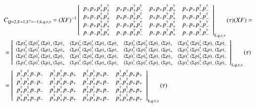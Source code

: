 \renewcommand{\dscor}[4]{\left(\Sigma p\right)_{#1}^\dagger \left(\Sigma p\right)_{#2}^\dagger \left(\Sigma p\right)_{#3}\left(\Sigma p\right)_{#4}}
\renewcommand{\dcor}[4]{p^\dagger_{#1}p^\dagger_{#2}p_{#3}p_{#4}}
\newcommand{\rcor}[4]{p_{#3}p_{#4}p^\dagger_{#1}p^\dagger_{#2}}
\begin{equation}
  \begin{aligned} 
    &C_{Q=2,S=1,S^3=-1;k,q,r,s} =
    (XF)^{-1} \left[
    \begin{array}{cccc}
      \cor{+}{+}{+}{+} & \cor{+}{+}{+}{-} & \cor{+}{+}{-}{+} & \cor{+}{+}{-}{-} \\
      \cor{+}{-}{+}{+} & \cor{+}{-}{+}{-} & \cor{+}{-}{-}{+} & \cor{+}{-}{-}{-} \\
      \cor{-}{+}{+}{+} & \cor{-}{+}{+}{-} & \cor{-}{+}{-}{+} & \cor{-}{+}{-}{-} \\
      \cor{-}{-}{+}{+} & \cor{-}{-}{+}{-} & \cor{-}{-}{-}{+} & \cor{-}{-}{-}{-} \\
    \end{array}
    \right]_{k,q,r,s} (\tau) (XF) = \\
    &= \left[\resizebox{\textwidth}{!}{%
    $
    \begin{array}{cccc}
      \dscor{+}{+}{+}{+} & \dscor{+}{+}{+}{-} & \dscor{+}{+}{-}{+} & \dscor{+}{+}{-}{-} \\
      \dscor{+}{-}{+}{+} & \dscor{+}{-}{+}{-} & \dscor{+}{-}{-}{+} & \dscor{+}{-}{-}{-} \\
      \dscor{-}{+}{+}{+} & \dscor{-}{+}{+}{-} & \dscor{-}{+}{-}{+} & \dscor{-}{+}{-}{-} \\
      \dscor{-}{-}{+}{+} & \dscor{-}{-}{+}{-} & \dscor{-}{-}{-}{+} & \dscor{-}{-}{-}{-} \\
    \end{array}$}
    \right]_{k,q,r,s} (\tau) \\
    &= \left[ 
    {\begin{array}{cccc}
      \dcor{-}{-}{-}{-} & \dcor{-}{-}{-}{+} & \dcor{-}{-}{+}{-} & \dcor{-}{-}{+}{+} \\
      \dcor{-}{+}{-}{-} & \dcor{-}{+}{-}{+} & \dcor{-}{+}{+}{-} & \dcor{-}{+}{+}{+} \\
      \dcor{+}{-}{-}{-} & \dcor{+}{-}{-}{+} & \dcor{+}{-}{+}{-} & \dcor{+}{-}{+}{+} \\
      \dcor{+}{+}{-}{-} & \dcor{+}{+}{-}{+} & \dcor{+}{+}{+}{-} & \dcor{+}{+}{+}{+} \\
    \end{array} } \right]_{k,q,r,s} (\tau) \\

\end{aligned}
\end{equation}
